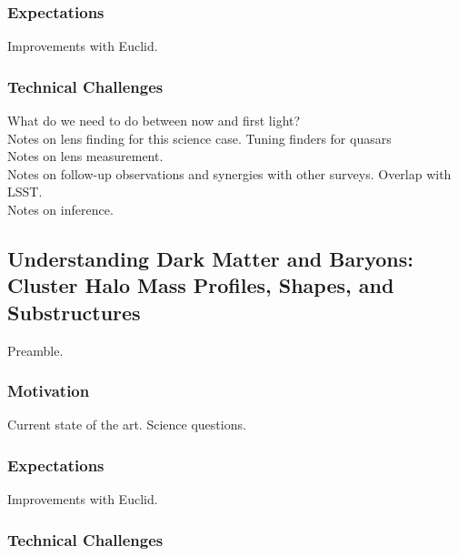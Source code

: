 \documentclass[twocolumn]{svjour3}
\begin{document}
\subsubsection{Expectations}
Improvements with Euclid.\\

\subsubsection{Technical Challenges}

What do we need to do between now and first light?\\

Notes on lens finding for this science case. Tuning finders for
quasars\\

Notes on lens measurement.\\

Notes on follow-up observations and synergies with other surveys.
Overlap with LSST.\\

Notes on inference.\\



\subsection{Understanding Dark Matter and Baryons: Cluster Halo Mass
Profiles, Shapes, and Substructures}



Preamble.

\subsubsection{Motivation}
Current state of the art. Science questions.\\

\subsubsection{Expectations}
Improvements with Euclid.\\

\subsubsection{Technical Challenges}
\end{document}
